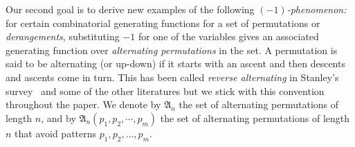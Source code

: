 \documentclass[12pt,reqno]{amsart}
\numberwithin{equation}{section}
\theoremstyle{plain}
\theoremstyle{definition}
\def\S{\mathfrak{S}}
\def\D{\mathfrak{D}}
\def\A{\mathfrak{A}}
\def\exc{\mathsf{exc}}
\def\dd{\mathsf{dd}}
\def\des{\mathsf{des}}
\begin{document}
Our second goal is to derive
new examples of the following \emph{$(-1)$-phenomenon:} for certain combinatorial generating functions for a set of permutations or \emph{derangements}, substituting $-1$ for one of the variables gives an associated generating function over \emph{alternating permutations} in the set. A permutation is said to be alternating (or up-down) if it starts with an ascent and then descents and ascents come in turn. This has been called \emph{reverse alternating} in Stanley's survey~\cite{Sta1} and some of the other literatures but we stick with this convention throughout the paper. We denote by $\A_n$ the set of alternating permutations of length $n$, and by $\A_n(p_1,p_2,\cdots,p_m)$ the set of alternating permutations of length $n$ that avoid patterns $p_1,p_2,\ldots,p_m$.
%
%
%
%
\end{document}
